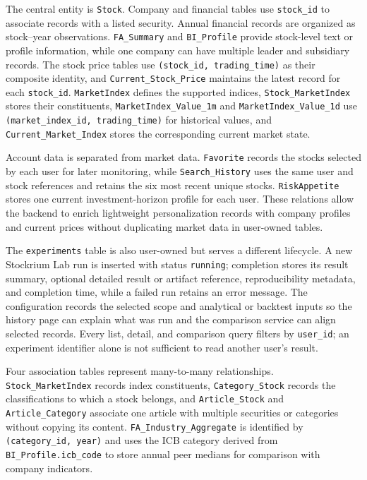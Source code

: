 The central entity is \texttt{Stock}. Company and financial tables use \texttt{stock\_id} to associate records with a listed security. Annual financial records are organized as stock--year observations. \texttt{FA\_Summary} and \texttt{BI\_Profile} provide stock-level text or profile information, while one company can have multiple leader and subsidiary records. The stock price tables use \texttt{(stock\_id, trading\_time)} as their composite identity, and \texttt{Current\_Stock\_Price} maintains the latest record for each \texttt{stock\_id}. \texttt{MarketIndex} defines the supported indices, \texttt{Stock\_MarketIndex} stores their constituents, \texttt{MarketIndex\_Value\_1m} and \texttt{MarketIndex\_Value\_1d} use \texttt{(market\_index\_id, trading\_time)} for historical values, and \texttt{Current\_Market\_Index} stores the corresponding current market state.

Account data is separated from market data. \texttt{Favorite} records the stocks selected by each user for later monitoring, while \texttt{Search\_History} uses the same user and stock references and retains the six most recent unique stocks. \texttt{RiskAppetite} stores one current investment-horizon profile for each user. These relations allow the backend to enrich lightweight personalization records with company profiles and current prices without duplicating market data in user-owned tables.

The \texttt{experiments} table is also user-owned but serves a different lifecycle. A new Stockrium Lab run is inserted with status \texttt{running}; completion stores its result summary, optional detailed result or artifact reference, reproducibility metadata, and completion time, while a failed run retains an error message. The configuration records the selected scope and analytical or backtest inputs so the history page can explain what was run and the comparison service can align selected records. Every list, detail, and comparison query filters by \texttt{user\_id}; an experiment identifier alone is not sufficient to read another user's result.

Four association tables represent many-to-many relationships. \texttt{Stock\_MarketIndex} records index constituents, \texttt{Category\_Stock} records the classifications to which a stock belongs, and \texttt{Article\_Stock} and \texttt{Article\_Category} associate one article with multiple securities or categories without copying its content. \texttt{FA\_Industry\_Aggregate} is identified by \texttt{(category\_id, year)} and uses the ICB category derived from \texttt{BI\_Profile.icb\_code} to store annual peer medians for comparison with company indicators.

